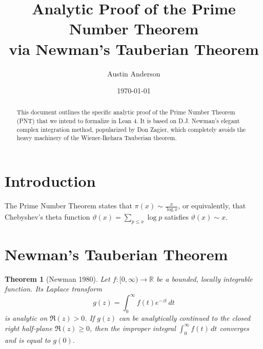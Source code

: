 \documentclass[12pt]{article}
\title{Analytic Proof of the Prime Number Theorem \\ via Newman's Tauberian Theorem}
\author{Austin Anderson}
\date{\today}
\newtheorem{theorem}{Theorem}
\begin{document}
\maketitle

\begin{abstract}
This document outlines the specific analytic proof of the Prime Number Theorem (PNT) that we intend to formalize in Lean 4. It is based on D.J. Newman's elegant complex integration method, popularized by Don Zagier, which completely avoids the heavy machinery of the Wiener-Ikehara Tauberian theorem.
\end{abstract}

\section{Introduction}
The Prime Number Theorem states that $\pi(x) \sim \frac{x}{\log x}$, or equivalently, that Chebyshev's theta function $\vartheta(x) = \sum_{p \le x} \log p$ satisfies $\vartheta(x) \sim x$. 

\section{Newman's Tauberian Theorem}

\begin{theorem}[Newman 1980]
Let $f: [0, \infty) \to \mathbb{R}$ be a bounded, locally integrable function. Its Laplace transform
\[ g(z) = \int_0^\infty f(t) e^{-zt} \, dt \]
is analytic on $\Re(z) > 0$. If $g(z)$ can be analytically continued to the closed right half-plane $\Re(z) \ge 0$, then the improper integral $\int_0^\infty f(t) \, dt$ converges and is equal to $g(0)$.
\end{theorem}
\end{document}
